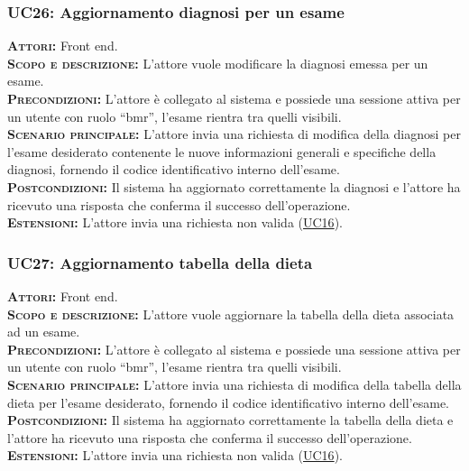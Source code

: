 \subsubsection{UC26: Aggiornamento diagnosi per un esame}
\label{sec:UC26}
\textsc{\textbf{Attori:}} Front end.\\
\textsc{\textbf{Scopo e descrizione:}} L'attore vuole modificare la diagnosi emessa per un esame.\\
\textsc{\textsc{\textbf{Precondizioni:}}} L'attore è collegato al sistema e possiede una sessione attiva per un utente con ruolo ``bmr'', l'esame rientra tra quelli visibili.\\
\textsc{\textbf{Scenario principale:}}  L'attore invia una richiesta di modifica della diagnosi per l'esame desiderato contenente le nuove informazioni generali e specifiche della diagnosi, fornendo il codice identificativo interno dell'esame.\\
\textsc{\textbf{Postcondizioni:}} Il sistema ha aggiornato correttamente la diagnosi e l'attore ha ricevuto una risposta che conferma il successo dell'operazione.\\
\textsc{\textbf{Estensioni:}} L'attore invia una richiesta non valida (\hyperref[sec:UC16]{UC16}).

\subsubsection{UC27: Aggiornamento tabella della dieta}
\label{sec:UC27}
\textsc{\textbf{Attori:}} Front end.\\
\textsc{\textbf{Scopo e descrizione:}} L'attore vuole aggiornare la tabella della dieta associata ad un esame.\\
\textsc{\textsc{\textbf{Precondizioni:}}} L'attore è collegato al sistema e possiede una sessione attiva per un utente con ruolo ``bmr'', l'esame rientra tra quelli visibili.\\
\textsc{\textbf{Scenario principale:}}  L'attore invia una richiesta di modifica della tabella della dieta per l'esame desiderato, fornendo il codice identificativo interno dell'esame.\\
\textsc{\textbf{Postcondizioni:}} Il sistema ha aggiornato correttamente la tabella della dieta e l'attore ha ricevuto una risposta che conferma il successo dell'operazione.\\
\textsc{\textbf{Estensioni:}} L'attore invia una richiesta non valida (\hyperref[sec:UC16]{UC16}).


